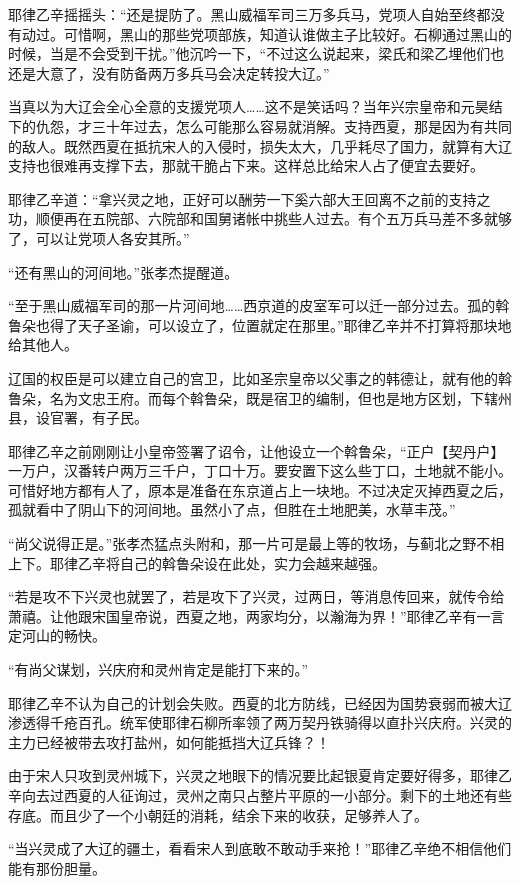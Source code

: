 耶律乙辛摇摇头：“还是提防了。黑山威福军司三万多兵马，党项人自始至终都没有动过。可惜啊，黑山的那些党项部族，知道认谁做主子比较好。石柳通过黑山的时候，当是不会受到干扰。”他沉吟一下，“不过这么说起来，梁氏和梁乙埋他们也还是大意了，没有防备两万多兵马会决定转投大辽。”

当真以为大辽会全心全意的支援党项人……这不是笑话吗？当年兴宗皇帝和元昊结下的仇怨，才三十年过去，怎么可能那么容易就消解。支持西夏，那是因为有共同的敌人。既然西夏在抵抗宋人的入侵时，损失太大，几乎耗尽了国力，就算有大辽支持也很难再支撑下去，那就干脆占下来。这样总比给宋人占了便宜去要好。

耶律乙辛道：“拿兴灵之地，正好可以酬劳一下奚六部大王回离不之前的支持之功，顺便再在五院部、六院部和国舅诸帐中挑些人过去。有个五万兵马差不多就够了，可以让党项人各安其所。”

“还有黑山的河间地。”张孝杰提醒道。

“至于黑山威福军司的那一片河间地……西京道的皮室军可以迁一部分过去。孤的斡鲁朵也得了天子圣谕，可以设立了，位置就定在那里。”耶律乙辛并不打算将那块地给其他人。

辽国的权臣是可以建立自己的宫卫，比如圣宗皇帝以父事之的韩德让，就有他的斡鲁朵，名为文忠王府。而每个斡鲁朵，既是宿卫的编制，但也是地方区划，下辖州县，设官署，有子民。

耶律乙辛之前刚刚让小皇帝签署了诏令，让他设立一个斡鲁朵，“正户【契丹户】一万户，汉番转户两万三千户，丁口十万。要安置下这么些丁口，土地就不能小。可惜好地方都有人了，原本是准备在东京道占上一块地。不过决定灭掉西夏之后，孤就看中了阴山下的河间地。虽然小了点，但胜在土地肥美，水草丰茂。”

“尚父说得正是。”张孝杰猛点头附和，那一片可是最上等的牧场，与蓟北之野不相上下。耶律乙辛将自己的斡鲁朵设在此处，实力会越来越强。

“若是攻不下兴灵也就罢了，若是攻下了兴灵，过两日，等消息传回来，就传令给萧禧。让他跟宋国皇帝说，西夏之地，两家均分，以瀚海为界！”耶律乙辛有一言定河山的畅快。

“有尚父谋划，兴庆府和灵州肯定是能打下来的。”

耶律乙辛不认为自己的计划会失败。西夏的北方防线，已经因为国势衰弱而被大辽渗透得千疮百孔。统军使耶律石柳所率领了两万契丹铁骑得以直扑兴庆府。兴灵的主力已经被带去攻打盐州，如何能抵挡大辽兵锋？！

由于宋人只攻到灵州城下，兴灵之地眼下的情况要比起银夏肯定要好得多，耶律乙辛向去过西夏的人征询过，灵州之南只占整片平原的一小部分。剩下的土地还有些存底。而且少了一个小朝廷的消耗，结余下来的收获，足够养人了。

“当兴灵成了大辽的疆土，看看宋人到底敢不敢动手来抢！”耶律乙辛绝不相信他们能有那份胆量。

